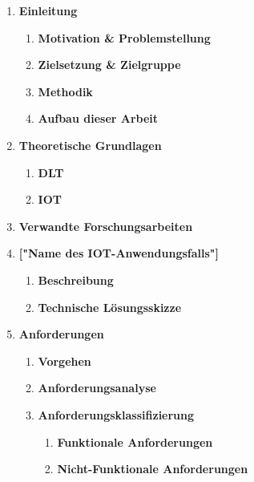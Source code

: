 \documentclass[
    ngerman,american
    ]{scrartcl}
\begin{document}
%
%
\begin{enumerate}

	\item \textbf{Einleitung}
	      \begin{enumerate}
	      	\item \textbf{Motivation \& Problemstellung}
	      	\item \textbf{Zielsetzung \& Zielgruppe}
	      	\item \textbf{Methodik}
	      	\item \textbf{Aufbau dieser Arbeit}
	      \end{enumerate}
	\item \textbf{Theoretische Grundlagen}
	      \begin{enumerate}
	      	\item \textbf{DLT}
	      	\item \textbf{IOT}
	      \end{enumerate}
	\item \textbf{Verwandte Forschungsarbeiten}
	\item \textbf{["Name des IOT-Anwendungsfalls"]}
	      \begin{enumerate}
	      	\item \textbf{Beschreibung}
	      	\item \textbf{Technische Lösungsskizze}
	      \end{enumerate}
	\item \textbf{Anforderungen}
	      \begin{enumerate}
	      	\item \textbf{Vorgehen}
	      	\item \textbf{Anforderungsanalyse}
	      	\item \textbf{Anforderungsklassifizierung}
	      	      \begin{enumerate}
	      	      	\item \textbf{Funktionale Anforderungen}
	      	      	\item \textbf{Nicht-Funktionale Anforderungen}

\end{enumerate}
\end{enumerate}
\end{enumerate}
\end{document}
